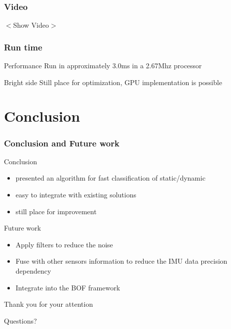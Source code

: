 \documentclass{beamer}
\begin{document}
	\begin{frame}
		\frametitle{Video}
		\centering
		$<$Show Video$>$
		
	\end{frame}		

	\begin{frame}
		\frametitle{Run time}

		\begin{alertblock}{Performance}
			Run in approximately 3.0ms in a 2.67Mhz processor
		\end{alertblock}		
		
		\begin{exampleblock}{Bright side}
			Still place for optimization, GPU implementation is possible
		\end{exampleblock}				
		
	\end{frame}	

\section{Conclusion}

	\begin{frame}
		\frametitle{Conclusion and Future work}
		
		\begin{block}{Conclusion}
			\begin{itemize}
			\item presented an algorithm for fast classification of static/dynamic
			\item easy to integrate with existing solutions
			\item still place for improvement
			\end{itemize}
		\end{block}		
		
		\begin{block}{Future work}
			\begin{itemize}
			\item Apply filters to reduce the noise
			\item Fuse with other sensors information to reduce the IMU data precision dependency
			\item Integrate into the BOF framework
			\end{itemize}
		\end{block}
		
	\end{frame}

	\begin{frame}{Thank you for your attention}
	\begin{alertblock}{}
		\centering
		Questions?
	\end{alertblock}
	\end{frame} 	
 	
{} 	
\end{document}
